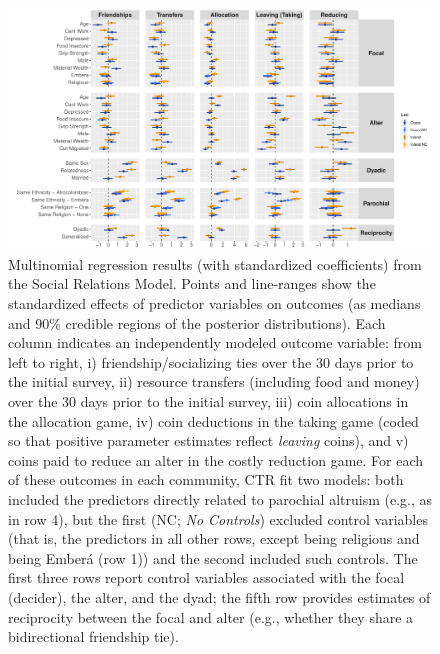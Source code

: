 \documentclass[bibauthoryear]{aa}
\begin{document}
 \begin{figure}[t]
 \centering
\includegraphics[width=7in]{All_Games-Standardized_SRM} %
\caption{{\footnotesize Multinomial regression results (with standardized coefficients) from the Social Relations Model. Points and line-ranges show the standardized effects of predictor variables on outcomes (as medians and 90\% credible regions of the posterior distributions). Each column indicates an independently modeled outcome variable: from left to right, i) friendship/socializing ties over the 30 days prior to the initial survey, ii) resource transfers (including food and money) over the 30 days prior to the initial survey, iii) coin allocations in the allocation game, iv) coin deductions in the taking game (coded so that positive parameter estimates reflect \textit{leaving} coins), and v) coins paid to reduce an alter in the costly reduction game. For each of these outcomes in each community, CTR fit two models: both included the predictors directly related to parochial altruism (e.g., as in row 4), but the first (NC; \textit{No Controls}) excluded control variables (that is, the predictors in all other rows, except being religious and being Ember\'a (row 1)) and the second included such controls. The first three rows report control variables associated with the focal (decider), the alter, and the dyad; the fifth row provides estimates of reciprocity between the focal and alter (e.g., whether they share a bidirectional friendship tie).}
} \label{colombianres}
\end{figure}
\end{document}
